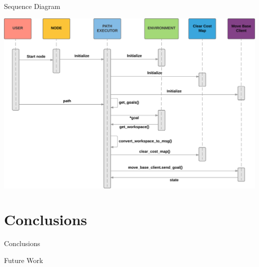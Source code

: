 \documentclass[10pt,aspectratio=43,xcolor={usenames,dvipsnames,table}]{beamer}
\begin{document}
\begin{frame}{Sequence Diagram}
    \begin{center}
        \includegraphics[width=\linewidth,height=0.9\textheight,keepaspectratio]{gfx/02.pdf}
    \end{center}
\end{frame}

\section{Conclusions}
\begin{frame}{Conclusions}
\end{frame}
\begin{frame}{Future Work}
\end{frame}
\end{document}
